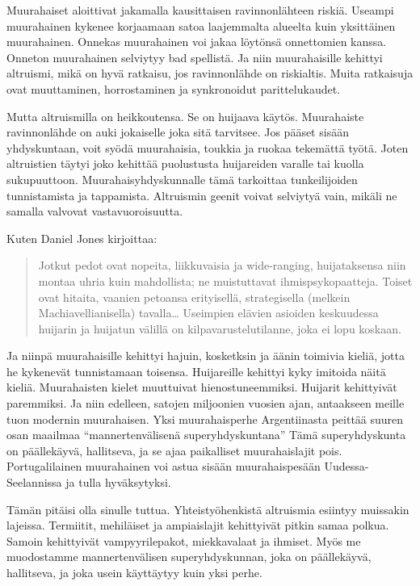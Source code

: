 Muurahaiset aloittivat jakamalla kausittaisen ravinnonlähteen riskiä. Useampi muurahainen kykenee korjaamaan satoa laajemmalta alueelta kuin yksittäinen muurahainen. Onnekas muurahainen voi jakaa löytönsä onnettomien kanssa. Onneton muurahainen selviytyy bad spellistä. Ja niin muurahaisille kehittyi altruismi, mikä on hyvä ratkaisu, jos ravinnonlähde on riskialtis. Muita ratkaisuja ovat muuttaminen, horrostaminen ja synkronoidut parittelukaudet.

Mutta altruismilla on heikkoutensa. Se on huijaava käytös. Muurahaiste ravinnonlähde on auki jokaiselle joka sitä tarvitsee. Jos pääset sisään yhdyskuntaan, voit syödä muurahaisia, toukkia ja ruokaa tekemättä työtä. Joten altruistien täytyi joko kehittää puolustusta huijareiden varalle tai kuolla sukupuuttoon. Muurahaisyhdyskunnalle tämä tarkoittaa tunkeilijoiden tunnistamista ja tappamista. Altruismin geenit voivat selviytyä vain, mikäli ne samalla valvovat vastavuoroisuutta.

Kuten Daniel Jones kirjoittaa:
\begin{quotation}
\noindent Jotkut pedot ovat nopeita, liikkuvaisia ja wide-ranging, huijataksensa niin montaa uhria kuin mahdollista; ne muistuttavat ihmispsykopaatteja. Toiset ovat hitaita, vaanien petoansa erityisellä, strategisella (melkein Machiavellianisella) tavalla{\ldots} Useimpien elävien asioiden keskuudessa huijarin ja huijatun välillä on kilpavarustelutilanne, joka ei lopu koskaan.
\end{quotation}
Ja niinpä muurahaisille kehittyi hajuin, kosketksin ja äänin toimivia kieliä, jotta he kykenevät tunnistamaan toisensa. Huijareille kehittyi kyky imitoida näitä kieliä. Muurahaisten kielet muuttuivat hienostuneemmiksi. Huijarit kehittyivät paremmiksi. Ja niin edelleen, satojen miljoonien vuosien ajan, antaakseen meille tuon modernin muurahaisen. Yksi muurahaisperhe Argentiinasta peittää suuren osan maailmaa ``mannertenvälisenä superyhdyskuntana'' Tämä superyhdyskunta on päällekäyvä, hallitseva, ja se ajaa paikalliset muurahaislajit pois. Portugalilainen muurahainen voi astua sisään muurahaispesään Uudessa-Seelannissa ja tulla hyväksytyksi.

Tämän pitäisi olla sinulle tuttua. Yhteistyöhenkistä altruismia esiintyy muissakin lajeissa. Termiitit, mehiläiset ja ampiaislajit kehittyivät pitkin samaa polkua. Samoin kehittyivät vampyyrilepakot, miekkavalaat ja ihmiset. Myös me muodostamme mannertenvälisen superyhdyskunnan, joka on päällekäyvä, hallitseva, ja joka usein käyttäytyy kuin yksi perhe.

